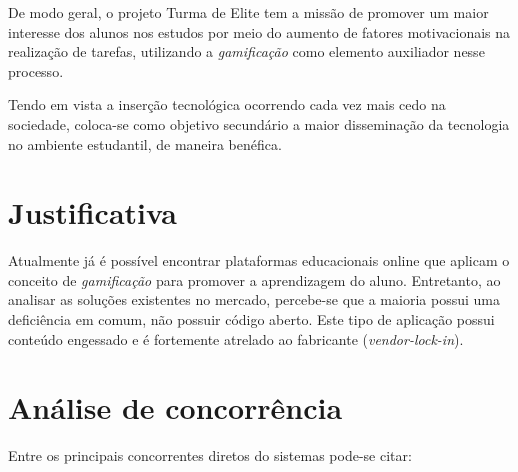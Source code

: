 \documentclass[
    12pt,               %
    openright,          %
    oneside,
    a4paper,            %
    english,            %
    brazil              %
    ]{ifsp-spo-inf-ctds} %
\begin{document}
De modo geral, o projeto Turma de Elite tem a missão de promover um maior interesse dos alunos nos estudos por meio do aumento de fatores motivacionais na realização de tarefas, utilizando a \textit{gamificação} como elemento auxiliador nesse processo.

Tendo em vista a inserção tecnológica ocorrendo cada vez mais cedo na sociedade, coloca-se como objetivo secundário a maior disseminação da tecnologia no ambiente estudantil, de maneira benéfica.

\section{Justificativa}
Atualmente já é possível encontrar plataformas educacionais online que aplicam o conceito de \textit{gamificação} para promover a aprendizagem do aluno. Entretanto, ao analisar as soluções existentes no mercado, percebe-se que a maioria possui uma deficiência em comum, não possuir código aberto. Este tipo de aplicação possui conteúdo engessado e é fortemente atrelado ao fabricante (\textit{\gls{vendor-lock-in}}). 


\section{Análise de concorrência}
Entre os principais concorrentes diretos do sistemas pode-se citar:
\end{document}
